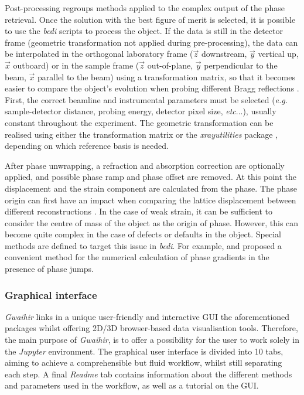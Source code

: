 Post-processing regroups methods applied to the complex output of the phase retrieval.
Once the solution with the best figure of merit is selected, it is possible to use the \textit{bcdi} scripts to process the object.
If the data is still in the detector frame (geometric transformation not applied during pre-processing), the data can be interpolated in the orthogonal laboratory frame ($\vec{z}$ downstream, $\vec{y}$ vertical up, $\vec{x}$ outboard) or in the sample frame ($\vec{z}$ out-of-plane, $\vec{y}$ perpendicular to the beam, $\vec{x}$ parallel to the beam) using a transformation matrix, so that it becomes easier to compare the object's evolution when probing different Bragg reflections \parencite{Lauraux2021}.
First, the correct beamline and instrumental parameters must be selected (\textit{e.g.} sample-detector distance, probing energy, detector pixel size, \textit{etc}...), usually constant throughout the experiment.
The geometric transformation can be realised using either the transformation matrix \parencite{Mark2005} or the \textit{xrayutilities} package \parencite{Kriegner2013}, depending on which reference basis is needed.

After phase unwrapping, a refraction and absorption correction are optionally applied, and possible phase ramp and phase offset are removed.
At this point the displacement and the strain component are calculated from the phase.
The phase origin can first have an impact when comparing the lattice displacement between different reconstructions \parencite{Atlan2023}.
In the case of weak strain, it can be sufficient to consider the centre of mass of the object as the origin of phase.
However, this can become quite complex in the case of defects or defaults in the object.
Special methods are defined to target this issue in \textit{bcdi}.
For example, \cite{GuizarSicairos2011} and \cite{Hofmann2020} proposed a convenient method for the numerical calculation of phase gradients in the presence of phase jumps.

\subsubsection{Graphical interface}

\textit{Gwaihir} links in a unique user-friendly and interactive GUI the aforementioned packages whilst offering 2D/3D browser-based data visualisation tools.
Therefore, the main purpose of \textit{Gwaihir}, is to offer a possibility for the user to work solely in the \textit{Jupyter} environment.
The graphical user interface is divided into 10 tabs, aiming to achieve a comprehensible but fluid workflow, whilst still separating each step.
A final \textit{Readme} tab contains information about the different methods and parameters used in the workflow, as well as a tutorial on the GUI.

